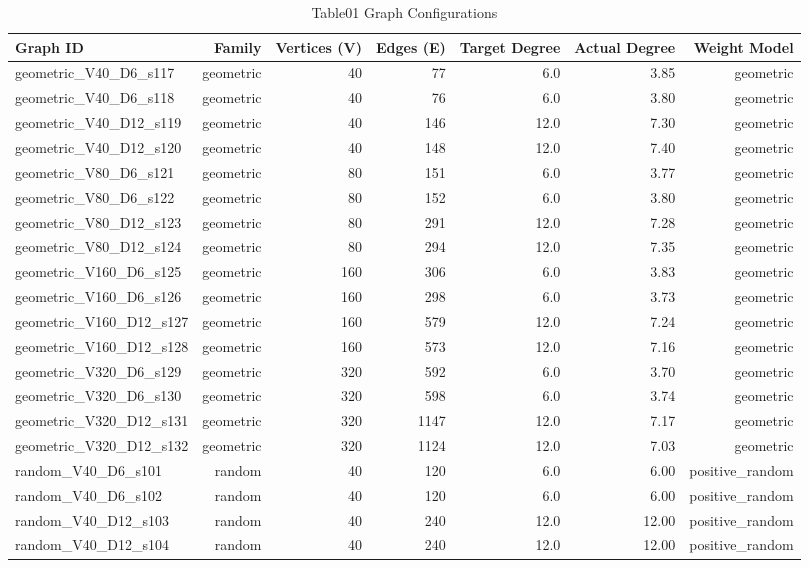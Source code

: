 \begin{table}[htbp]
\centering
\caption{Table01 Graph Configurations}
\begin{tabular}{lrrrrrr}
\hline
Graph ID & Family & Vertices (V) & Edges (E) & Target Degree & Actual Degree & Weight Model \\
\hline
geometric\_V40\_D6\_s117 & geometric & 40 & 77 & 6.0 & 3.85 & geometric \\
geometric\_V40\_D6\_s118 & geometric & 40 & 76 & 6.0 & 3.80 & geometric \\
geometric\_V40\_D12\_s119 & geometric & 40 & 146 & 12.0 & 7.30 & geometric \\
geometric\_V40\_D12\_s120 & geometric & 40 & 148 & 12.0 & 7.40 & geometric \\
geometric\_V80\_D6\_s121 & geometric & 80 & 151 & 6.0 & 3.77 & geometric \\
geometric\_V80\_D6\_s122 & geometric & 80 & 152 & 6.0 & 3.80 & geometric \\
geometric\_V80\_D12\_s123 & geometric & 80 & 291 & 12.0 & 7.28 & geometric \\
geometric\_V80\_D12\_s124 & geometric & 80 & 294 & 12.0 & 7.35 & geometric \\
geometric\_V160\_D6\_s125 & geometric & 160 & 306 & 6.0 & 3.83 & geometric \\
geometric\_V160\_D6\_s126 & geometric & 160 & 298 & 6.0 & 3.73 & geometric \\
geometric\_V160\_D12\_s127 & geometric & 160 & 579 & 12.0 & 7.24 & geometric \\
geometric\_V160\_D12\_s128 & geometric & 160 & 573 & 12.0 & 7.16 & geometric \\
geometric\_V320\_D6\_s129 & geometric & 320 & 592 & 6.0 & 3.70 & geometric \\
geometric\_V320\_D6\_s130 & geometric & 320 & 598 & 6.0 & 3.74 & geometric \\
geometric\_V320\_D12\_s131 & geometric & 320 & 1147 & 12.0 & 7.17 & geometric \\
geometric\_V320\_D12\_s132 & geometric & 320 & 1124 & 12.0 & 7.03 & geometric \\
random\_V40\_D6\_s101 & random & 40 & 120 & 6.0 & 6.00 & positive\_random \\
random\_V40\_D6\_s102 & random & 40 & 120 & 6.0 & 6.00 & positive\_random \\
random\_V40\_D12\_s103 & random & 40 & 240 & 12.0 & 12.00 & positive\_random \\
random\_V40\_D12\_s104 & random & 40 & 240 & 12.0 & 12.00 & positive\_random \\

\end{tabular}
\end{table}
